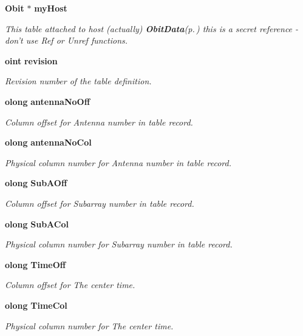 \begin{CompactItemize}
{\bf Obit} $\ast$ {\bf my\-Host}
\begin{CompactList}\small\item\em This table attached to host (actually) {\bf Obit\-Data}{\rm (p.\,\pageref{structObitData})} this is a secret reference - don't use Ref or Unref functions. \item\end{CompactList}\item 
{\bf oint} {\bf revision}
\begin{CompactList}\small\item\em Revision number of the table definition. \item\end{CompactList}\item 
{\bf olong} {\bf antenna\-No\-Off}
\begin{CompactList}\small\item\em Column offset for Antenna number in table record. \item\end{CompactList}\item 
{\bf olong} {\bf antenna\-No\-Col}
\begin{CompactList}\small\item\em Physical column number for Antenna number in table record. \item\end{CompactList}\item 
{\bf olong} {\bf Sub\-AOff}
\begin{CompactList}\small\item\em Column offset for Subarray number in table record. \item\end{CompactList}\item 
{\bf olong} {\bf Sub\-ACol}
\begin{CompactList}\small\item\em Physical column number for Subarray number in table record. \item\end{CompactList}\item 
{\bf olong} {\bf Time\-Off}
\begin{CompactList}\small\item\em Column offset for The center time. \item\end{CompactList}\item 
{\bf olong} {\bf Time\-Col}
\begin{CompactList}\small\item\em Physical column number for The center time. \item\end{CompactList}\item 

\end{CompactItemize}
